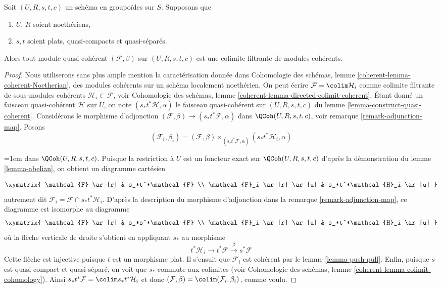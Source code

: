 \begin{lemma}
\label{lemma-colimit-coherent}
Soit $(U, R, s, t, c)$ un schéma en groupoïdes sur $S$.
Supposons que
\begin{enumerate}
\item $U$, $R$ soient noethériens,
\item $s, t$ soient plats, quasi-compacts et quasi-séparés.
\end{enumerate}
Alors tout module quasi-cohérent $(\mathcal{F}, \beta)$ sur $(U, R, s, t, c)$
est une colimite filtrante de modules cohérents.
\end{lemma}

\begin{proof}
Nous utiliserons sans plus ample mention la caractérisation donnée dans
Cohomologie des schémas, lemme \ref{coherent-lemma-coherent-Noetherian}, des
modules cohérents sur un schéma localement noethérien. On peut écrire
$\mathcal{F} = \colim \mathcal{H}_i$ comme colimite filtrante
de sous-modules cohérents $\mathcal{H}_i \subset \mathcal{F}$, voir
Cohomologie des schémas, lemme \ref{coherent-lemma-directed-colimit-coherent}.
Étant donné un faisceau quasi-cohérent $\mathcal{H}$ sur $U$, on note
$(s_*t^*\mathcal{H}, \alpha)$ le faisceau quasi-cohérent sur $(U, R, s, t, c)$ du
lemme \ref{lemma-construct-quasi-coherent}. Considérons le morphisme d'adjonction
$(\mathcal{F}, \beta) \to (s_*t^*\mathcal{F}, \alpha)$ dans
$\QCoh(U, R, s, t, c)$, voir remarque \ref{remark-adjunction-map}.
Posons
$$
(\mathcal{F}_i, \beta_i) =
(\mathcal{F}, \beta)
\times_{(s_*t^*\mathcal{F}, \alpha)}
(s_*t^*\mathcal{H}_i, \alpha)
$$
{\emergencystretch=1em dans $\QCoh(U,\allowbreak R,\allowbreak s,\allowbreak t,\allowbreak c)$. Puisque la restriction à $U$ est un foncteur exact
sur $\QCoh(U,\allowbreak R,\allowbreak s,\allowbreak t,\allowbreak c)$ d'après la démonstration du lemme \ref{lemma-abelian},
on obtient un diagramme cartésien\par}
$$
\xymatrix{
\mathcal{F} \ar[r] & s_*t^*\mathcal{F} \\
\mathcal{F}_i \ar[r] \ar[u] & s_*t^*\mathcal{H}_i \ar[u]
}
$$
autrement dit $\mathcal{F}_i = \mathcal{F} \cap s_*t^*\mathcal{H}_i$.
D'après la description du morphisme d'adjonction dans la remarque \ref{remark-adjunction-map},
ce diagramme est isomorphe au diagramme
$$
\xymatrix{
\mathcal{F} \ar[r] & s_*s^*\mathcal{F} \\
\mathcal{F}_i \ar[r] \ar[u] & s_*t^*\mathcal{H}_i \ar[u]
}
$$
où la flèche verticale de droite s'obtient en appliquant $s_*$ au morphisme
$$
t^*\mathcal{H}_i \to t^*\mathcal{F} \xrightarrow{\beta} s^*\mathcal{F}
$$
Cette flèche est injective puisque $t$ est un morphisme plat. Il s'ensuit que
$\mathcal{F}_i$ est cohérent par le lemme \ref{lemma-push-pull}.
Enfin, puisque $s$ est quasi-compact et quasi-séparé, on voit que
$s_*$ commute aux colimites (voir
Cohomologie des schémas, lemme \ref{coherent-lemma-colimit-cohomology}).
Ainsi $s_*t^*\mathcal{F} = \colim s_*t^*\mathcal{H}_i$ et donc
$(\mathcal{F}, \beta) = \colim (\mathcal{F}_i, \beta_i)$, comme voulu.
\end{proof}

